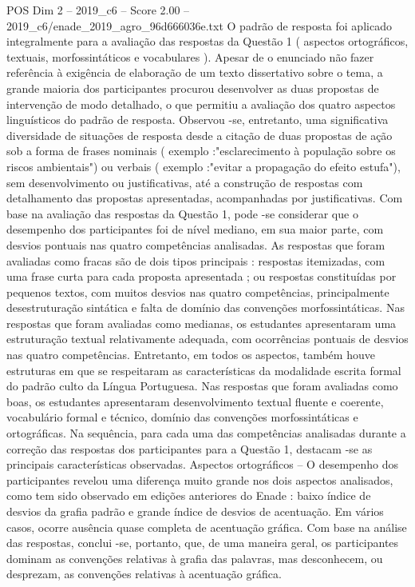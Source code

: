 \begin{textsample}{POS Dim 2 – 2019\_c6 – Score 2.00 – 2019\_c6/enade\_2019\_agro\_96d666036e.txt}
O padrão de resposta foi aplicado integralmente para a avaliação das respostas da Questão 1 ( aspectos ortográficos, textuais, morfossintáticos e vocabulares ).
Apesar de o enunciado não fazer referência à exigência de elaboração de um texto dissertativo sobre o tema, a grande maioria dos participantes procurou desenvolver as duas propostas de intervenção de modo detalhado, o que permitiu a avaliação dos quatro aspectos linguísticos do padrão de resposta.
Observou -se, entretanto, uma significativa diversidade de situações de resposta desde a citação de duas propostas de ação sob a forma de frases nominais ( exemplo :"esclarecimento à população sobre os riscos ambientais") ou verbais ( exemplo :"evitar a propagação do efeito estufa"), sem desenvolvimento ou justificativas, até a construção de respostas com detalhamento das propostas apresentadas, acompanhadas por justificativas.
Com base na avaliação das respostas da Questão 1, pode -se considerar que o desempenho dos participantes foi de nível mediano, em sua maior parte, com desvios pontuais nas quatro competências analisadas.
As respostas que foram avaliadas como fracas são de dois tipos principais : respostas itemizadas, com uma frase curta para cada proposta apresentada ; ou respostas constituídas por pequenos textos, com muitos desvios nas quatro competências, principalmente desestruturação sintática e falta de domínio das convenções morfossintáticas.
Nas respostas que foram avaliadas como medianas, os estudantes apresentaram uma estruturação textual relativamente adequada, com ocorrências pontuais de desvios nas quatro competências.
Entretanto, em todos os aspectos, também houve estruturas em que se respeitaram as características da modalidade escrita formal do padrão culto da Língua Portuguesa.
Nas respostas que foram avaliadas como boas, os estudantes apresentaram desenvolvimento textual fluente e coerente, vocabulário formal e técnico, domínio das convenções morfossintáticas e ortográficas.
Na sequência, para cada uma das competências analisadas durante a correção das respostas dos participantes para a Questão 1, destacam -se as principais características observadas.
Aspectos ortográficos – O desempenho dos participantes revelou uma diferença muito grande nos dois aspectos analisados, como tem sido observado em edições anteriores do Enade : baixo índice de desvios da grafia padrão e grande índice de desvios de acentuação.
Em vários casos, ocorre ausência quase completa de acentuação gráfica.
Com base na análise das respostas, conclui -se, portanto, que, de uma maneira geral, os participantes dominam as convenções relativas à grafia das palavras, mas desconhecem, ou desprezam, as convenções relativas à acentuação gráfica.

\end{textsample}
